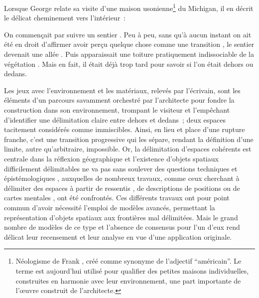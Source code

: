 

Lorsque George  relate sa visite d’une maison
usonienne\footnote{Néologisme de Frank , créé comme
  synonyme de l'adjectif \enquote{américain}. Le terme est aujourd'hui
  utilisé pour qualifier des petites maisons individuelles,
  construites en harmonie avec leur environnement, une part importante
  de l'œuvre construit de l'architecte.} du Michigan, il en décrit le
délicat cheminement vers l’intérieur :

\begin{displayquote}
    On commençait par suivre un sentier \textelp{}. Peu à peu,
    \textelp{} sans qu’à aucun instant on ait été en droit d’affirmer
    avoir perçu quelque chose comme une transition \textelp{}, le
    sentier devenait \textelp{} une allée \textelp{}. Puis
    apparaissait \textelp{} une toiture \textelp{} pratiquement
    indissociable de la végétation \textelp{}. Mais en fait, il était
    déjà trop tard pour savoir si l’on était dehors ou dedans.
\end{displayquote}

  Les jeux avec l’environnement et les matériaux, relevés par
l’écrivain, sont les éléments d’un parcours savamment orchestré par
l’architecte pour fondre la construction dans son environnement,
trompant le visiteur et l’empêchant d’identifier une délimitation
claire entre dehors et dedans ; deux espaces tacitement considérés
comme immiscibles. Ainsi, en lieu et place d’une rupture franche,
c’est une transition progressive qui les sépare, rendant la définition
d’une limite, autre qu’arbitraire, impossible.  Or, la délimitation
d’espaces cohérents est centrale dans la réflexion géographique et
l’existence d’objets spatiaux difficilement délimitables ne va pas
sans soulever des questions techniques et épistémologiques
\autocite{Burrough1996b}, auxquelles de nombreux travaux, comme ceux
cherchant à délimiter des espaces à partir de ressentis
\autocite{Arabacioglu2010}, de descriptions de positions
\autocite{Jones2007, Wolter2018, Bunel2019,} ou de cartes mentales
\autocite{Dutozia2014}, ont été confrontés. Ces différents travaux ont
pour point commun d’avoir nécessité l’emploi de modèles avancés,
permettant la représentation d’objets spatiaux aux frontières mal
délimitées. Mais le grand nombre de modèles de ce type et l’absence de
consensus pour l’un d’eux rend délicat leur recensement et leur
analyse en vue d’une application originale.


